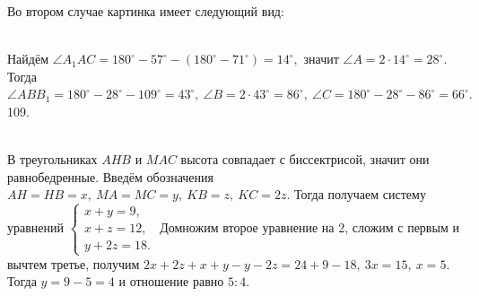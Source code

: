 \documentclass[12pt]{article}
\begin{document}
Во втором случае картинка имеет следующий вид:\\
\begin{figure}[ht!]
\end{figure}\\
Найдём $\angle A_1AC=180^\circ-57^\circ-(180^\circ-71^\circ)=14^\circ,$ значит $\angle A=2\cdot14^\circ=28^\circ.$ Тогда $\angle ABB_1=180^\circ-28^\circ-109^\circ=43^\circ,\ \angle B=2\cdot43^\circ=86^\circ,\ \angle C=180^\circ-28^\circ-86^\circ=66^\circ.$\\
109. \begin{figure}[ht!]
\end{figure}\\
В треугольниках $AHB$ и $MAC$ высота совпадает с биссектрисой, значит они равнобедренные. Введём обозначения $AH=HB=x,\ MA=MC=y,\ KB=z,\ KC=2z.$ Тогда получаем систему уравнений $\begin{cases} x+y=9,\\ x+z=12,\\ y+2z=18.\end{cases}$ Домножим второе уравнение на 2, сложим с первым и вычтем третье, получим $2x+2z+x+y-y-2z=24+9-18,\ 3x=15,\ x=5.$ Тогда $y=9-5=4$ и отношение равно $5:4.$\\
\end{document}
